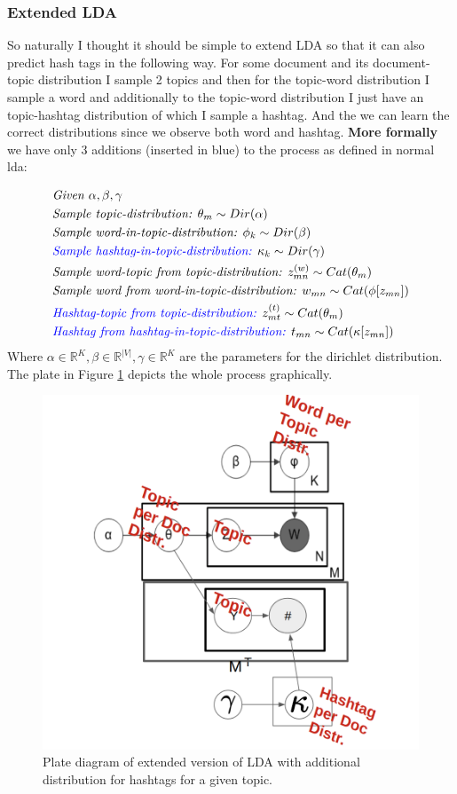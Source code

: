 \documentclass[10pt,conference,compsocconf]{IEEEtran}
\newcommand\R{\mathbb{R}}
\begin{document}
\subsubsection{Extended LDA}
So naturally I thought it should be simple to extend LDA so that it can also predict hash tags in the following way. For some document and its document-topic distribution I sample 2 topics and then for the topic-word distribution I sample a word and additionally to the topic-word distribution I just have an topic-hashtag distribution of which I sample a hashtag. And the we can learn the correct distributions since we observe both word and hashtag. \textbf{More formally} we have only 3 additions (inserted in blue) to the process as defined in normal lda: 

\small
\begin{align*}
&\textit{Given } \alpha, \beta, \gamma \\
&\textit{Sample topic-distribution: } \theta_m \sim Dir(\alpha)\\
&\textit{Sample word-in-topic-distribution: } \phi_k \sim Dir(\beta) \\
& \textcolor{blue}{\textit{Sample hashtag-in-topic-distribution: }} \kappa_k \sim Dir(\gamma) \\
&\textit{Sample word-topic from topic-distribution: } z^{(w)}_{mn} \sim Cat(\theta_m) \\
&\textit{Sample word from word-in-topic-distribution: } w_{mn} \sim Cat(\phi[z_{mn}])\\
&\textcolor{blue}{\textit{Hashtag-topic from topic-distribution: }} z^{(t)}_{mt} \sim Cat(\theta_m) \\
&\textcolor{blue}{\textit{Hashtag from hashtag-in-topic-distribution: }} t_{mn} \sim Cat(\kappa[z_{mn}])\\
\end{align*}
\normalsize
Where $\alpha \in \R^K, \beta \in \R^{|V|}, \gamma \in \R^K$ are the parameters for the dirichlet distribution. The plate in Figure \ref{fig:ldaplate2} depicts the whole process graphically.
\begin{figure}
	\centering
	\includegraphics[width=0.7\linewidth]{images/extended_lda}
	\caption{Plate diagram of extended version of LDA with additional distribution for hashtags for a given topic. }
	\label{fig:ldaplate2}
\end{figure}
\end{document}
